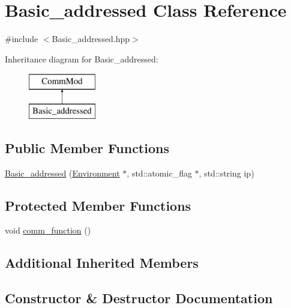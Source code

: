 \hypertarget{class_basic__addressed}{}\section{Basic\+\_\+addressed Class Reference}
\label{class_basic__addressed}


{\ttfamily \#include $<$Basic\+\_\+addressed.\+hpp$>$}

Inheritance diagram for Basic\+\_\+addressed\+:\begin{figure}[H]
\begin{center}
\leavevmode
\includegraphics[height=2.000000cm]{class_basic__addressed}
\end{center}
\end{figure}
\subsection*{Public Member Functions}
\begin{DoxyCompactItemize}
\item 
\hyperlink{class_basic__addressed_a9a202e4eab46bb38b02ca1e0699d3084}{Basic\+\_\+addressed} (\hyperlink{class_environment}{Environment} $\ast$, std\+::atomic\+\_\+flag $\ast$, std\+::string ip)
\end{DoxyCompactItemize}
\subsection*{Protected Member Functions}
\begin{DoxyCompactItemize}
\item 
void \hyperlink{class_basic__addressed_ac884eb8fca81e164c0f6c073b2d4df80}{comm\+\_\+function} ()
\end{DoxyCompactItemize}
\subsection*{Additional Inherited Members}


\subsection{Constructor \& Destructor Documentation}
